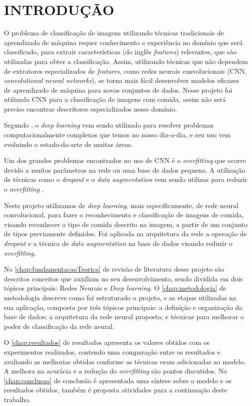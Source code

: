 
\chapter{INTRODUÇÃO}
\label{chap:introducao}
O problema de classificação de imagens utilizando técnicas tradicionais de aprendizado de máquina requer conhecimento e experiência no domínio que será classificado, para extrair características (do inglês \textit{features}) relevantes, que são utilizadas para obter a classificação. Assim, utilizando técnicas que não dependem de extratores especializados de \textit{features}, como redes neurais convolucionais (CNN, \textit{convolutional neural networks}), se torna mais fácil desenvolver modelos eficazes de aprendizado de máquina para novos conjuntos de dados. Nesse projeto foi utilizada CNN para a classificação de imagens com comida, assim não será preciso encontrar descritores especializados nesse domínio. 
\par Segundo , o \textit{deep learning} vem sendo utilizado para resolver problemas computacionalmente complexos que temos no nosso dia-a-dia, e seu uso vem evoluindo o estado-da-arte de muitas áreas.
\par Um dos grandes problemas encontrados no uso de CNN é o \textit{overfitting} \cite{imaginetArticle} que ocorre devido a muitos parâmetros na rede ou uma base de dados pequena. A utilização de técnicas como o \textit{dropout} e o \textit{data augmentation} vem sendo utilizas para reduzir o \textit{overfitting} \cite{srivastava2014dropout}.

\par Neste projeto utilizamos de \textit{deep learning}, mais especificamente, de rede neural convolucional, para fazer o reconhecimento e classificação de imagens de comida, visando reconhecer o tipo de comida descrito na imagem, a partir de um conjunto de tipos previamente definidos. Foi aplicada na arquitetura da rede a operação de \textit{dropout} e a técnica de \textit{data augmentation} na base de dados visando reduzir o \textit{overfitting}. 
\par No \autoref{chap:fundamentacaoTeorica} de revisão de literatura desse projeto são descritos conceitos que auxiliam no seu desenvolvimento, sendo dividida em dois tópicos principais: Redes Neurais e \textit{Deep learning}. O \autoref{chap:metodologia} de metodologia descreve como foi estruturado o projeto, e as etapas utilizadas na sua aplicação, composta por três tópicos principais: a definição e organização da base de dados; a arquitetura da rede neural proposta; e técnicas para melhorar o poder de classificação da rede neural.
\par O \autoref{chap:resultados} de resultados apresenta os valores obtidos com os experimentos realizados, contendo uma comparação entre os resultados e avaliando as melhorias obtidas conforme as técnicas eram adicionadas ao modelo. A melhora na acurácia e a redução do \textit{overfitting} são pontos discutidos. No \autoref{chap:conclusao} de conclusão é apresentada uma síntese sobre o modelo e os resultados obtidos, também é proposta atividades para a continuação deste trabalho.

